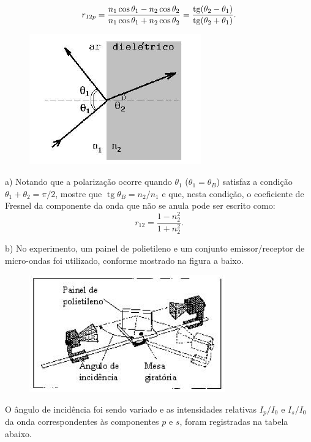 \begin{enumerate}[start=1,label={\bfseries Q\arabic*.}]
\begin{multicols}{2}
$$
r_{12p} = \frac{n_{1} \operatorname{cos} \theta_{1} - n_{2} \operatorname{cos} \theta_{2}}{n_{1} \operatorname{cos} \theta_{1} + n_{2} \operatorname{cos} \theta_{2}} =  \frac{\operatorname{tg}( \theta_{2} - \theta_{1} )}{\operatorname{tg}( \theta_{2} + \theta_{1} )}.\\
$$

\begin{figure}[H]
\centering
\includegraphics[scale=0.7]{eletromag-img/dieletrico2.png}
\end{figure}

\end{multicols}


a) Notando que a polarização ocorre quando $\theta_{1}$ ($\theta_{1} = \theta_{B}$) satisfaz a condição $\theta_{1} + \theta_{2} = \pi/2$, mostre que $\operatorname{tg} \theta_{B} = n_{2}/n_{1}$ e que, nesta condição, o coeficiente de Fresnel da componente da onda que não se anula pode ser escrito como:
$$
r_{12} = \frac{1 - n_{2}^{2}}{1 + n_{2}^{2}}.
$$

\resposta

b) No experimento, um painel de polietileno e um conjunto emissor/receptor de micro-ondas foi utilizado, conforme mostrado na figura a baixo.
\begin{figure}[H]
\centering
\includegraphics[scale=0.7]{eletromag-img/experimento.png}
\end{figure}
O ângulo de incidência foi sendo variado e as intensidades relativas $I_{p}/I_{0}$ e $I_{s}/I_{0}$ da onda correspondentes às componentes $p$ e $s$, foram registradas na tabela abaixo.


\end{enumerate}
